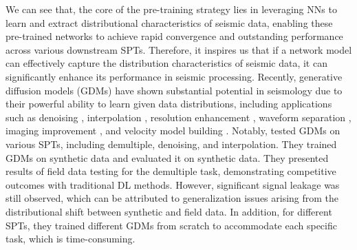 We can see that, the core of the pre-training strategy lies in leveraging NNs to learn and extract distributional characteristics of seismic data, enabling these pre-trained networks to achieve rapid convergence and outstanding performance across various downstream SPTs. Therefore, it inspires us that if a network model can effectively capture the distribution characteristics of seismic data, it can significantly enhance its performance in seismic processing. Recently, generative diffusion models (GDMs) have shown substantial potential in seismology due to their powerful ability to learn given data distributions, including applications such as denoising \citep{li2024conditional, xiao2024diffusion, trappolini2024cold}, interpolation \citep{wei2023seismic, liu2024generative, wang2024self, wei2024seismic}, resolution enhancement \citep{zhang2024seisresodiff}, waveform separation \citep{zhang2024conditional}, imaging improvement \cite{shi2024generative}, and velocity model building \citep{wang2023prior, wang2024controllable, taufik2024learned}. Notably, \cite{durall2023deep} tested GDMs on various SPTs, including demultiple, denoising, and interpolation. They trained GDMs on synthetic data and evaluated it on synthetic data. They presented results of field data testing for the demultiple task, demonstrating competitive outcomes with traditional DL methods. However, significant signal leakage was still observed, which can be attributed to generalization issues arising from the distributional shift between synthetic and field data. In addition, for different SPTs, they trained different GDMs from scratch to accommodate each specific task, which is time-consuming. 

